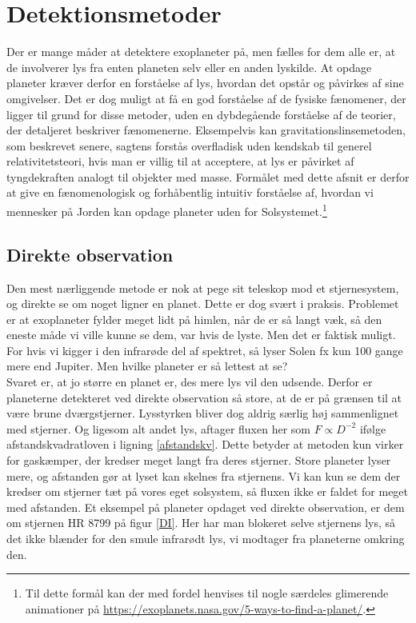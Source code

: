 \section{Detektionsmetoder}
Der er mange måder at detektere exoplaneter på, men fælles for dem alle er, at de involverer lys fra enten planeten selv eller en anden lyskilde. At opdage planeter kræver derfor en forståelse af lys, hvordan det opstår og påvirkes af sine omgivelser. Det er dog muligt at få en god forståelse af de fysiske fænomener, der ligger til grund for disse metoder, uden en dybdegående forståelse af de teorier, der detaljeret beskriver fænomenerne. Eksempelvis kan gravitationslinsemetoden, som beskrevet senere, sagtens forstås overfladisk uden kendskab til generel relativitetsteori, hvis man er villig til at acceptere, at lys er påvirket af tyngdekraften analogt til objekter med masse. Formålet med dette afsnit er derfor at give en fænomenologisk og forhåbentlig intuitiv forståelse af, hvordan vi mennesker på Jorden kan opdage planeter uden for Solsystemet.\footnote{Til dette formål kan der med fordel henvises til nogle særdeles glimerende animationer på \url{https://exoplanets.nasa.gov/5-ways-to-find-a-planet/}.}

\subsection*{Direkte observation}

Den mest nærliggende metode er nok at pege sit teleskop mod et stjernesystem, og direkte se om noget ligner en planet. Dette er dog svært i praksis. Problemet er at exoplaneter fylder meget lidt på himlen, når de er så langt væk, så den eneste måde vi ville kunne se dem, var hvis de lyste. Men det er faktisk muligt. For hvis vi kigger i den infrarøde del af spektret, så lyser Solen fx kun 100 gange mere end Jupiter. %
Men hvilke planeter er så lettest at se? \\
Svaret er, at jo større en planet er, des mere lys vil den udsende. Derfor er planeterne detekteret ved direkte observation så store, at de er på grænsen til at være brune dværgstjerner. %
%
%
Lysstyrken bliver dog aldrig særlig høj sammenlignet med stjerner. Og ligesom alt andet lys, aftager fluxen her som $F\propto D^{-2}$ ifølge afstandskvadratloven i ligning \eqref{afstandskv}. Dette betyder at metoden kun virker for gaskæmper, der kredser meget langt fra deres stjerner. Store planeter lyser mere, og afstanden gør at lyset kan skelnes fra stjernens. Vi kan kun se dem der kredser om stjerner tæt på vores eget solsystem, så fluxen ikke er faldet for meget med afstanden. %
%
Et eksempel på planeter opdaget ved direkte observation, er dem om stjernen HR 8799 på figur \ref{DI}. Her har man blokeret selve stjernens lys, så det ikke blænder for den smule infrarødt lys, vi modtager fra planeterne omkring den.

